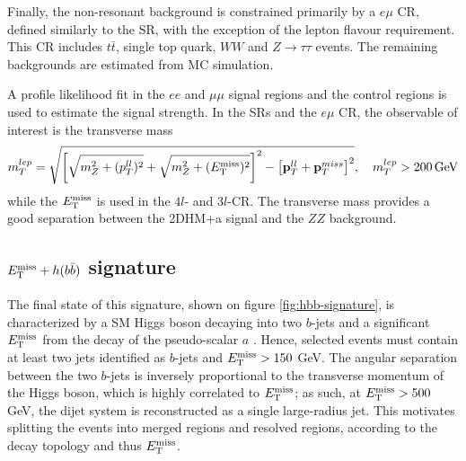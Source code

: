 Finally, the non-resonant background is constrained primarily by a $e\mu$ CR, defined similarly to the SR, with the exception of the lepton flavour requirement. This CR includes $t\bar{t}$, single top quark, $WW$ and $Z\rightarrow \tau\tau$ events. The remaining backgrounds are estimated from MC simulation. 

A profile likelihood fit in the $ee$ and $\mu\mu$ signal regions and the control regions is used to estimate the signal strength. In the SRs and the $e\mu$ CR, the observable of interest is the transverse mass
\begin{equation}
    \label{4.9}
    m_T^{lep}=\sqrt{\left[ \sqrt{m_Z^2+(p_T^{ll})^2} + \sqrt{m_Z^2+ (E_{\mathrm{T}}^{\mathrm{miss}})^2} \right] ^2 - \left[ \mathbf{p}_T^{ll} + \mathbf{p}_T^{miss} \right]^2},\quad m_T^{lep}>200 \,\mathrm{GeV}
\end{equation}
while the $E_{\mathrm{T}}^{\mathrm{miss}}$ is used in the $4l$- and $3l$-CR. The transverse mass provides a good separation between the 2DHM+a signal and the $ZZ$ background. 

\subsection{\texorpdfstring{$E_{\mathrm{T}}^{\mathrm{miss}}+h(b\bar{b})$}{TEXT} signature}

The final state of this signature, shown on figure \ref{fig:hbb-signature}, is characterized by a SM Higgs boson decaying into two $b$-jets and a significant $E_{\mathrm{T}}^{\mathrm{miss}}$ from the decay of the pseudo-scalar $a$ \cite{EXOT-2018-46}. Hence, selected events must contain at least two jets identified as $b$-jets and $E_{\mathrm{T}}^{\mathrm{miss}}>150$ GeV. The angular separation between the two $b$-jets is inversely proportional to the transverse momentum of the Higgs boson, which is highly correlated to $E_{\mathrm{T}}^{\mathrm{miss}}$; as such, at $E_{\mathrm{T}}^{\mathrm{miss}}>500$ GeV, the dijet system is reconstructed as a single large-radius jet. This motivates splitting the events into merged regions and resolved regions, according to the decay topology and thus $E_{\mathrm{T}}^{\mathrm{miss}}$. 

